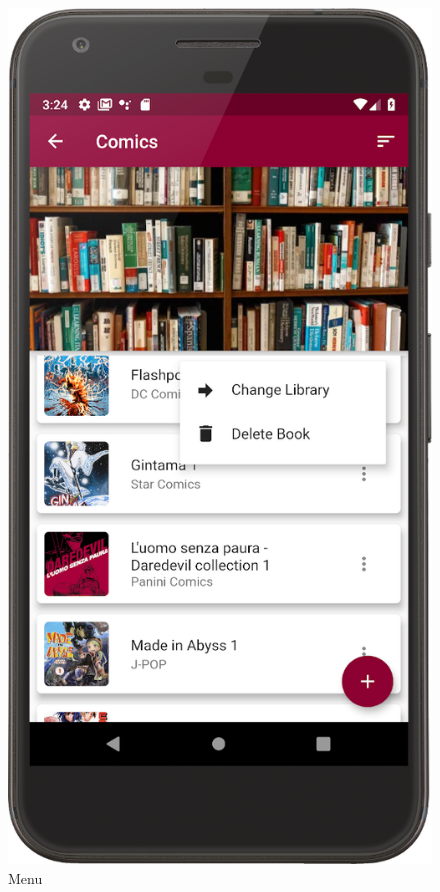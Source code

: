 \begin{figure}[!htb]
\begin{minipage}[b]{0.3\textwidth}
        \caption{Menu}
        \label{ref:menu}
    \end{minipage}
    \hfill
    \begin{minipage}[b]{0.3\textwidth}
        \centering
        \includegraphics[scale=1]{images/library-page.png}

\end{minipage}
\end{figure}
